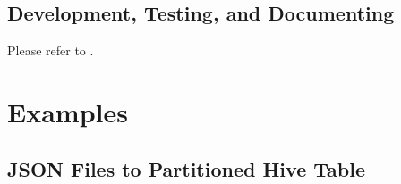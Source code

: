 \documentclass[a4paper,10pt, twoside,english]{sphinxmanual}
\begin{document}
\subsection{Development, Testing, and Documenting}
\label{\detokenize{installation:development-testing-and-documenting}}
Please refer to {\hyperref[\detokenize{setup_development_testing:dev-setup}]{}}.


\section{Examples}
\label{\detokenize{examples:examples}}\label{\detokenize{examples::doc}}

\subsection{JSON Files to Partitioned Hive Table}
\label{\detokenize{examples:json-files-to-partitioned-hive-table}}
\end{document}
